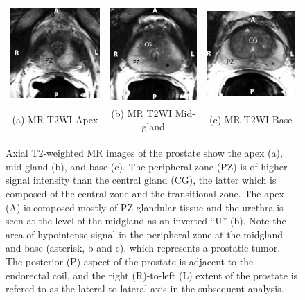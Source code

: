 \begin{figure}[htb!]
\centering
\begin{tabular}{ccc}
\includegraphics[width=0.29\linewidth]{figs/mr_anatomy/T2_apex} &
\includegraphics[width=0.275\linewidth]{figs/mr_anatomy/T2_midgland} &
\includegraphics[width=0.3\linewidth]{figs/mr_anatomy/T2_base} \\
(a) MR T2WI Apex & (b) MR T2WI Mid-gland & (c) MR T2WI Base \\
\end{tabular}
\caption{Axial T2-weighted MR images of the prostate show the apex (a),
    mid-gland (b), and base (c).  The peripheral zone (PZ) is of higher signal
    intensity than the central gland (CG), the latter which is composed of the
    central zone and the transitional zone. The apex (A) is composed mostly of
    PZ glandular tissue and the urethra is seen at the level of the midgland as
    an inverted ``U'' (b). Note the area of hypointense signal in the
    peripheral zone at the midgland and base (asterisk, b and c), which
    represents a prostatic tumor.  The posterior (P) aspect of the prostate is
    adjacent to the endorectal coil, and the right (R)-to-left (L) extent of
    the prostate is refered to as the lateral-to-lateral axis in the subsequent
    analysis.}
\label{fig:mr_anatomy} 
\end{figure}
